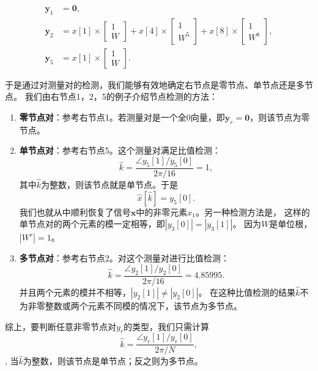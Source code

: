 \documentclass[AutoFakeBold]{LZUThesis}
\begin{document}
\begin{equation*}
    \begin{aligned}
        \mathbf{y}_1 &= \mathbf{0}, \\
        \mathbf{y}_2 &= x[1] \times 
        \left[
            \begin{array}{c}
                1 \\ W
            \end{array}
        \right] + x[4] \times 
        \left[
            \begin{array}{c}
                1 \\ W^5
            \end{array}
        \right] + x[8] \times
        \left[
            \begin{array}{c}
                1 \\ W^8
            \end{array}
        \right], \\
        \mathbf{y}_5 &= x[1] \times
        \left[
            \begin{array}{c}
                1 \\ W
            \end{array}
        \right]. 
    \end{aligned}
\end{equation*}

于是通过对测量对的检测，我们能够有效地确定右节点是零节点、单节点还是多节点。
我们由右节点1，2，5的例子介绍节点检测的方法：

\begin{enumerate}
    \item \textbf{零节点对}：参考右节点1。若测量对是一个全0向量，即$\mathbf{y}_r = \mathbf{0}$，则该节点为零节点。
    \item \textbf{单节点对}：参考右节点5。这个测量对满足比值检测：
        \begin{equation*}
            \hat{k} = \frac{\angle y_5[1] / y_5[0]}{2 \pi / 16} = 1, 
        \end{equation*}
        其中$\hat k$为整数，则该节点就是单节点。于是
        \begin{equation*}
            \hat x [\hat k] = y_5 [0]. 
        \end{equation*}
        我们也就从中顺利恢复了信号$\mathbf{x}$中的非零元素$x_1$。另一种检测方法是，
        这样的单节点对的两个元素的模一定相等，即$|y_3[0]| = |y_3[1]|$。
        因为$W$是单位根，$|W^r| = 1$。
    \item \textbf{多节点对}：参考右节点2。对这个测量对进行比值检测：
        \begin{equation*}
            \hat k = \frac{\angle y_2[1] / y_2[0]}{2 \pi / 16} = 4.85995. 
        \end{equation*}
        并且两个元素的模并不相等，$|y_2[1]| \neq |y_2[0]|$。
        在这种比值检测的结果$\hat k$不为非零整数或两个元素不同模的情况下，该节点为多节点。
\end{enumerate}
综上，要判断任意非零节点对$y_r$的类型，我们只需计算
\begin{equation}
    \label{k}
    \hat k = \frac{\angle y_r[1] / y_r[0]}{2 \pi / N},
\end{equation},
当$\hat k$为整数，则该节点是单节点；反之则为多节点。
\end{document}
